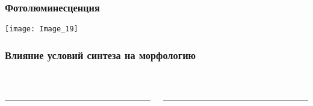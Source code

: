 \begin{frame}
	\frametitle{Фотолюминесценция}
	\centering
	\texttt{[image: Image\_19]}
\end{frame}

\begin{frame}
	\frametitle{Влияние условий синтеза на морфологию}
	\begin{columns}
	\begin{column}{0.4\textwidth}
	\centering
	\\
	\begin{minipage}[c]{0.47\linewidth}
	\end{minipage}
	\begin{minipage}[c]{0.47\linewidth}
	\end{minipage}
	\bigskip
	\hrule{}
	\bigskip
	\\
	\begin{minipage}[t]{0.47\linewidth}
	\end{minipage}
	\begin{minipage}[t]{0.47\linewidth}
	\end{minipage}
\end{column}

\begin{column}{0.4\textwidth}
	\centering
{}
\\
\begin{minipage}[t]{0.3\linewidth}
\end{minipage}
\begin{minipage}[t]{0.3\linewidth}
\end{minipage}
\begin{minipage}[t]{0.3\linewidth}
\end{minipage}
\bigskip
\hrule{}
\bigskip
{}
\\
\begin{minipage}[t]{0.3\linewidth}
\end{minipage}
\begin{minipage}[t]{0.3\linewidth}
\end{minipage}
\begin{minipage}[t]{0.3\linewidth}
\end{minipage}
\end{column}
\end{columns}
\end{frame}


